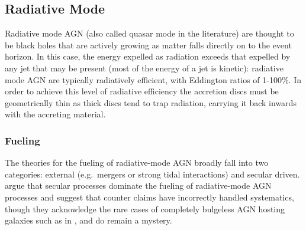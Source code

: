 	\subsection{Radiative Mode}
		\label{subsec:Radiative}
		Radiative mode AGN (also called quasar mode in the literature) are thought to be black holes that are actively growing as matter falls directly on to the event horizon. In this case, the energy expelled as radiation exceeds that expelled by any jet that may be present (most of the energy of a jet is kinetic): radiative mode AGN are typically radiatively efficient, with Eddington ratios of 1-100\%. In order to achieve this level of radiative efficiency the accretion discs must be geometrically thin as thick discs tend to trap radiation, carrying it back inwards with the accreting material. 

		\subsubsection{Fueling}
			\label{subsubsec:RadiativeFueling}
			The theories for the fueling of radiative-mode AGN broadly fall into two categories: external (e.g.\ mergers or strong tidal interactions) and secular driven. \citet{Heckman2014} argue that secular processes dominate the fueling of radiative-mode AGN processes and suggest that counter claims have incorrectly handled systematics, though they acknowledge the rare cases of completely bulgeless AGN hosting galaxies such as in \citet{Filippenko1993}, \citet{Satyapal2009} and \citet{Simmons2013} do remain a mystery. 

